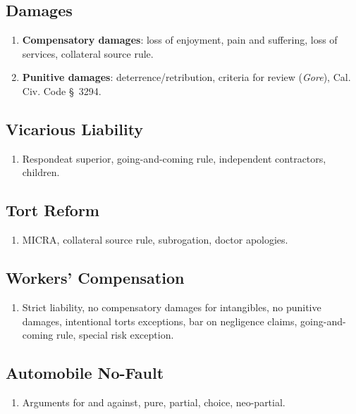 \subsection{Damages}

\begin{enumerate}
    \item \textbf{Compensatory damages}: loss of enjoyment, pain and 
    suffering, loss of services, collateral source rule.
    \item \textbf{Punitive damages}: deterrence/retribution, criteria for 
    review (\emph{Gore}), Cal. Civ. Code \S\ 3294.
\end{enumerate}

\subsection{Vicarious Liability}

\begin{enumerate}
    \item Respondeat superior, going-and-coming rule, independent contractors, 
    children.
\end{enumerate}

\subsection{Tort Reform}

\begin{enumerate}
    \item MICRA, collateral source rule, subrogation, doctor apologies.
\end{enumerate}

\subsection{Workers' Compensation}

\begin{enumerate}
    \item Strict liability, no compensatory damages for intangibles, no 
    punitive damages, intentional torts exceptions, bar on negligence claims, 
    going-and-coming rule, special risk exception.
\end{enumerate}

\subsection{Automobile No-Fault}

\begin{enumerate}
    \item Arguments for and against, pure, partial, choice, neo-partial.
\end{enumerate}

